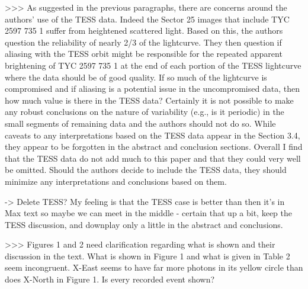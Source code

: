 >>> As suggested in the previous paragraphs, there are concerns around the authors' use of the TESS data. Indeed the Sector 25 images that include TYC 2597 735 1 suffer from heightened scattered light. Based on this, the authors question the reliability of nearly 2/3 of the lightcurve. They then question if aliasing with the TESS orbit might be responsible for the repeated apparent brightening of TYC 2597 735 1 at the end of each portion of the TESS lightcurve where the data should be of good quality. If so much of the lightcurve is compromised and if aliasing is a potential issue in the uncompromised data, then how much value is there in the TESS data? Certainly it is not possible to make any robust conclusions on the nature of variability (e.g., is it periodic) in the small segments of remaining data and the authors should not do so. While caveats to any interpretations based on the TESS data appear in the Section 3.4, they appear to be forgotten in the abstract and conclusion sections. Overall I find that the TESS data do not add much to this paper and that they could very well be omitted. Should the authors decide to include the TESS data, they should minimize any interpretations and conclusions based on them.

-> Delete TESS? My feeling is that the TESS case is better than then it's in Max text so maybe we can meet in the middle - certain that up a bit, keep the TESS discussion, and downplay only a little in the abstract and conclusions.


>>> Figures 1 and 2 need clarification regarding what is shown and their discussion in the text. What is shown in Figure 1 and what is given in Table 2 seem incongruent. X-East seems to have far more photons in its yellow circle than does X-North in Figure 1. Is every recorded event shown?

